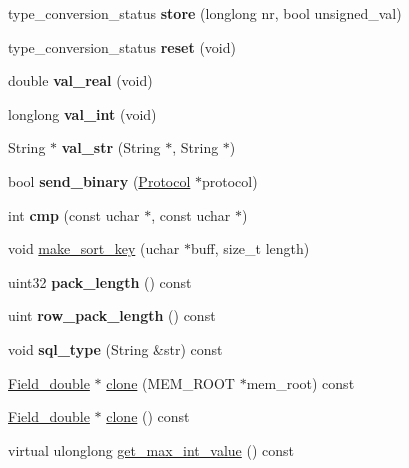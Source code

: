 \begin{DoxyCompactItemize}
type\+\_\+conversion\+\_\+status {\bfseries store} (longlong nr, bool unsigned\+\_\+val)
\item 
\mbox{\label{classField__double_a07b413753b72e9b02d25c98d7315513c}} 
type\+\_\+conversion\+\_\+status {\bfseries reset} (void)
\item 
\mbox{\label{classField__double_a4d5400372a11ae63d03dc93ade4bc020}} 
double {\bfseries val\+\_\+real} (void)
\item 
\mbox{\label{classField__double_aa47df544f3bf19f425160394cdebfef6}} 
longlong {\bfseries val\+\_\+int} (void)
\item 
\mbox{\label{classField__double_a03e91491d193f95c04261ce47ce965f9}} 
String $\ast$ {\bfseries val\+\_\+str} (String $\ast$, String $\ast$)
\item 
\mbox{\label{classField__double_ae5024c0e7ef7ac18a1b2bd88faccd770}} 
bool {\bfseries send\+\_\+binary} (\mbox{\hyperlink{classProtocol}{Protocol}} $\ast$protocol)
\item 
\mbox{\label{classField__double_a6cc650220a0efc10b9f270fc29431251}} 
int {\bfseries cmp} (const uchar $\ast$, const uchar $\ast$)
\item 
void \mbox{\hyperlink{classField__double_a624c276b59ae696a33b583ae689fcbcc}{make\+\_\+sort\+\_\+key}} (uchar $\ast$buff, size\+\_\+t length)
\item 
\mbox{\label{classField__double_a31e7d479921b46399111507d8c802569}} 
uint32 {\bfseries pack\+\_\+length} () const
\item 
\mbox{\label{classField__double_acd0c88983c63b7cf5b9f281d9af65427}} 
uint {\bfseries row\+\_\+pack\+\_\+length} () const
\item 
\mbox{\label{classField__double_aa824e63c11ad2e824b10bfdf6d255d02}} 
void {\bfseries sql\+\_\+type} (String \&str) const
\item 
\mbox{\hyperlink{classField__double}{Field\+\_\+double}} $\ast$ \mbox{\hyperlink{classField__double_aaad7ee85ba4751cb63c772d66bf47075}{clone}} (M\+E\+M\+\_\+\+R\+O\+OT $\ast$mem\+\_\+root) const
\item 
\mbox{\hyperlink{classField__double}{Field\+\_\+double}} $\ast$ \mbox{\hyperlink{classField__double_aaddb916e4e4853341ee54dc9d5b43f55}{clone}} () const
\item 
virtual ulonglong \mbox{\hyperlink{classField__double_a1b4d62698e48975973a6cd5ec77c9a6a}{get\+\_\+max\+\_\+int\+\_\+value}} () const
\end{DoxyCompactItemize}

